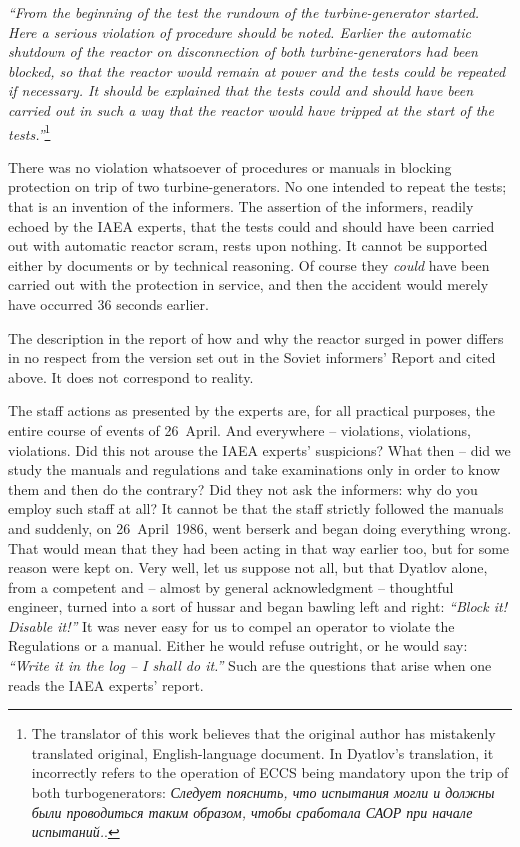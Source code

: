 \documentclass[openright]{bookest}
\begin{document}
\begin{personal}
\textit{``From the beginning of the test the rundown of the turbine-generator started. Here a serious violation of procedure should be noted. Earlier the automatic shutdown of the reactor on disconnection of both turbine-generators had been blocked, so that the reactor would remain at power and the tests could be repeated if necessary. It should be explained that the tests could and should have been carried out in such a way that the reactor would have tripped at the start of the tests.''}\footnote{The translator of this work believes that the original author has mistakenly translated original, English-language document. In Dyatlov's translation, it incorrectly refers to the operation of ECCS being mandatory upon the trip of both turbogenerators: \textit{Следует пояснить, что испытания могли и должны были проводиться таким образом, чтобы сработала САОР при начале испытаний.}.}
\end{personal}

There was no violation whatsoever of procedures or manuals in blocking protection on trip of two turbine-generators. No one intended to repeat the tests; that is an invention of the informers. The assertion of the informers, readily echoed by the IAEA experts, that the tests could and should have been carried out with automatic reactor scram, rests upon nothing. It cannot be supported either by documents or by technical reasoning. Of course they \textit{could} have been carried out with the protection in service, and then the accident would merely have occurred \num{36} seconds earlier.

The description in the report of how and why the reactor surged in power differs in no respect from the version set out in the Soviet informers' Report and cited above. It does not correspond to reality.

The staff actions as presented by the experts are, for all practical purposes, the entire course of events of 26~April. And everywhere -- violations, violations, violations. Did this not arouse the IAEA experts' suspicions? What then -- did we study the manuals and regulations and take examinations only in order to know them and then do the contrary? Did they not ask the informers: why do you employ such staff at all? It cannot be that the staff strictly followed the manuals and suddenly, on 26~April~1986, went berserk and began doing everything wrong. That would mean that they had been acting in that way earlier too, but for some reason were kept on. Very well, let us suppose not all, but that Dyatlov alone, from a competent and -- almost by general acknowledgment -- thoughtful engineer, turned into a sort of hussar and began bawling left and right: \textit{``Block it! Disable it!''} It was never easy for us to compel an operator to violate the Regulations or a manual. Either he would refuse outright, or he would say: \textit{``Write it in the log -- I shall do it.''} Such are the questions that arise when one reads the IAEA experts' report.
\end{document}
